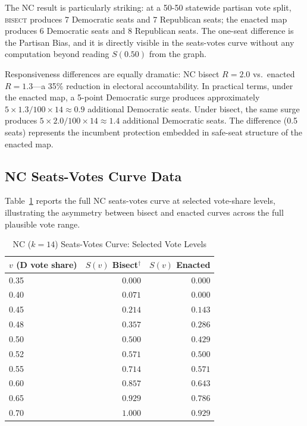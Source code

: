 The NC result is particularly striking: at a 50-50 statewide partisan vote split,
\textsc{bisect} produces 7 Democratic seats and 7 Republican seats; the enacted map
produces 6 Democratic seats and 8 Republican seats. The one-seat difference is the
Partisan Bias, and it is directly visible in the seats-votes curve without any
computation beyond reading $S(0.50)$ from the graph.

Responsiveness differences are equally dramatic: NC bisect $R = 2.0$ vs.\ enacted
$R = 1.3$---a 35\% reduction in electoral accountability. In practical terms, under
the enacted map, a 5-point Democratic surge produces approximately $5 \times 1.3/100
\times 14 \approx 0.9$ additional Democratic seats. Under bisect, the same surge
produces $5 \times 2.0/100 \times 14 \approx 1.4$ additional Democratic seats.
The difference (0.5 seats) represents the incumbent protection embedded in
safe-seat structure of the enacted map.

\subsection{NC Seats-Votes Curve Data}

Table~\ref{tab:nc-sv-data} reports the full NC seats-votes curve at selected
vote-share levels, illustrating the asymmetry between bisect and enacted curves
across the full plausible vote range.

\begin{table}[ht]
\centering
\caption{NC ($k=14$) Seats-Votes Curve: Selected Vote Levels}
\label{tab:nc-sv-data}
\begin{tabular}{@{}lrr@{}}
\toprule
$v$ (D vote share) & $S(v)$ Bisect$^\dagger$ & $S(v)$ Enacted \\
\midrule
0.35 & $0.000$ & $0.000$ \\
0.40 & $0.071$ & $0.000$ \\
0.45 & $0.214$ & $0.143$ \\
0.48 & $0.357$ & $0.286$ \\
0.50 & $0.500$ & $0.429$ \\
0.52 & $0.571$ & $0.500$ \\
0.55 & $0.714$ & $0.571$ \\
0.60 & $0.857$ & $0.643$ \\
0.65 & $0.929$ & $0.786$ \\
0.70 & $1.000$ & $0.929$ \\
\bottomrule
\end{tabular}
\end{table}

